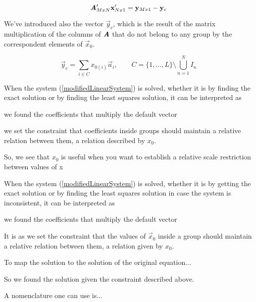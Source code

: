 \begin{equation}
\bm{\mathit{A}}'_{MxN} \mathbf{x}'_{Nx1} = \mathbf{y}_{Mx1} - \mathbf{y}_c
\label{modifiedLinearSystem}
\end{equation}

We've introduced also the vector $\vec{y}_c$, which is the result of the matrix multiplication of the columns of $\bm{\mathit{A}}$ that do not belong to any group by the correspondent elements of $\vec{x}_0$.

\begin{equation}
\vec{y}_c = \sum_{i \in C} x_{0(i)} \vec{a}_i , \qquad
C = \{1, \ldots, L\} \setminus \bigcup_{n=1}^N I_n
\end{equation}

When the system (\autoref{modifiedLinearSystem}) is solved, whether it is by finding the exact solution or by finding the least squares solution, it can be interpreted as

we found the coefficients that multiply the default vector 

we set the constraint that coefficients inside groups should maintain a relative relation between them, a relation described by $x_0$.

So, we see that $x_0$ is useful when you want to establish a relative scale restriction between values of x


When the system (\autoref{modifiedLinearSystem}) is solved, whether it is by getting the exact solution or by finding the least squares solution in case the system is inconsistent, it can be interpreted as

we found the coefficients that multiply the default vector 

It is as we set the constraint that the values of $\vec{x}_0$ inside a group should maintain a relative relation between them, a relation given by $x_0$.

To map the solution to the solution of the original equation...

So we found the solution given the constraint described above.

A nomenclature one can use is...

